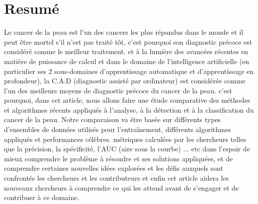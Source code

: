 \section*{Resumé}
Le cancer de la peau est l'un des cancers les plus répandus dans le monde et il peut être mortel s'il n'est pas traité tôt, c'est pourquoi son diagnostic précoce est considéré comme le meilleur traitement. et à la lumière des avancées récentes en matière de puissance de calcul et dans le domaine de l'intelligence artificielle (en particulier ses 2 sous-domaines d'apprentissage automatique et d'apprentissage en profondeur), la C.A.D (diagnostic assisté par ordinateur) est considérée comme l'un des meilleurs moyens de diagnostic précoce du cancer de la peau. c'est pourquoi, dans cet article, nous allons faire une étude comparative des méthodes et algorithmes récents appliqués à l'analyse, à la détection et à la classification du cancer de la peau. Notre comparaison va être basée sur différents types d'ensembles de données utilisés pour l'entraînement, différents algorithmes appliqués et performances célèbres. métriques calculées par les chercheurs telles que la précision, la spécificité, l'AUC (aire sous la courbe) ... etc dans l'espoir de mieux comprendre le problème à résoudre et ses solutions appliquées, et de comprendre certaines nouvelles idées explorées et les défis auxquels sont confrontés les chercheurs et les contributeurs et enfin cet article aidera les nouveaux chercheurs à comprendre ce qui les attend avant de s'engager et de contribuer à ce domaine.


